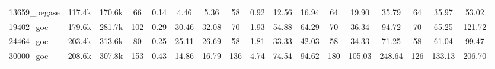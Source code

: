 \documentclass{standalone}
\begin{document}
\begin{tabular}{|l|c|c|cccc|cccc|ccc|ccc|}
13659\_pegase 
& 117.4k
& 170.6k
& 66 
&  0.14
&  4.46
&  5.36
& 58 
&  0.92
& 12.56
& 16.94
& 64 
& 19.90
& 35.79
& 64 
& 35.97
& 53.02
\\

19402\_goc 
& 179.6k
& 281.7k
& 102 
&  0.29
& 30.46
& 32.08
& 70 
&  1.93
& 54.88
& 64.29
& 70 
& 36.34
& 94.72
& 70 
& 65.25
& 121.72
\\

24464\_goc 
& 203.4k
& 313.6k
& 80 
&  0.25
& 25.11
& 26.69
& 58 
&  1.81
& 33.33
& 42.03
& 58 
& 34.33
& 71.25
& 58 
& 61.04
& 99.47
\\

30000\_goc 
& 208.6k
& 307.8k
& 153 
&  0.43
& 14.86
& 16.79
& 136 
&  4.74
& 74.54
& 94.62
& 180 
& 105.03
& 248.64
& 126 
& 133.13
& 206.70

  \\
  \hline
\end{tabular}
\end{document}

